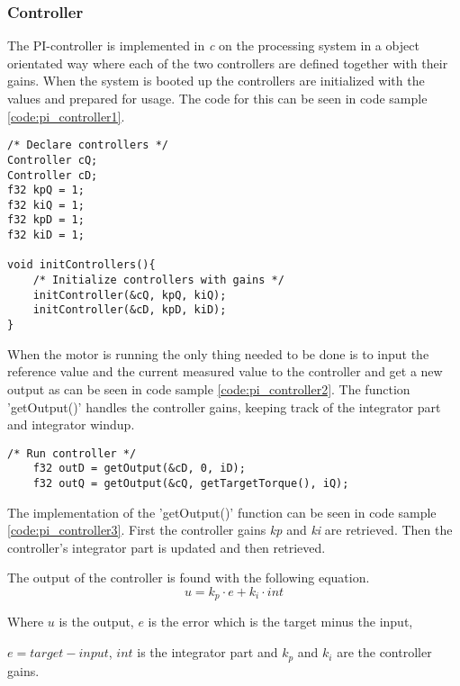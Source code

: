 \subsubsection{Controller}

The PI-controller is implemented in \textit{c} on the processing system in a object orientated way where each of the two controllers are defined together with their gains. When the system is booted up the controllers are initialized with the values and prepared for usage. The code for this can be seen in code sample \ref{code:pi_controller1}.

\begin{lstlisting}[style=c, caption=Initialization of PI-controller., label=code:pi_controller1]
/* Declare controllers */
Controller cQ;
Controller cD;
f32 kpQ = 1;
f32 kiQ = 1;
f32 kpD = 1;
f32 kiD = 1;

void initControllers(){
    /* Initialize controllers with gains */
    initController(&cQ, kpQ, kiQ);
    initController(&cD, kpD, kiD);
}
\end{lstlisting}

When the motor is running the only thing needed to be done is to input the reference value and the current measured value to the controller and get a new output as can be seen in code sample \ref{code:pi_controller2}. The function 'getOutput()' handles the controller gains, keeping track of the integrator part and integrator windup.

\begin{lstlisting}[style=c, caption=Usage of PI-controller., label=code:pi_controller2]
    /* Run controller */
	f32 outD = getOutput(&cD, 0, iD);
	f32 outQ = getOutput(&cQ, getTargetTorque(), iQ);
\end{lstlisting}

The implementation of the 'getOutput()' function can be seen in code sample \ref{code:pi_controller3}.
First the controller gains \textit{kp} and \textit{ki} are retrieved. Then the controller's integrator part is updated and then retrieved.

The output of the controller is found with the following equation.
\begin{equation}
    u = k_p \cdot e + k_i \cdot int
\end{equation}

Where $u$ is the output, $e$ is the error which is the target minus the input, 

$e = target - input$, $int$ is the integrator part and $k_p$ and $k_i$ are the controller gains.

